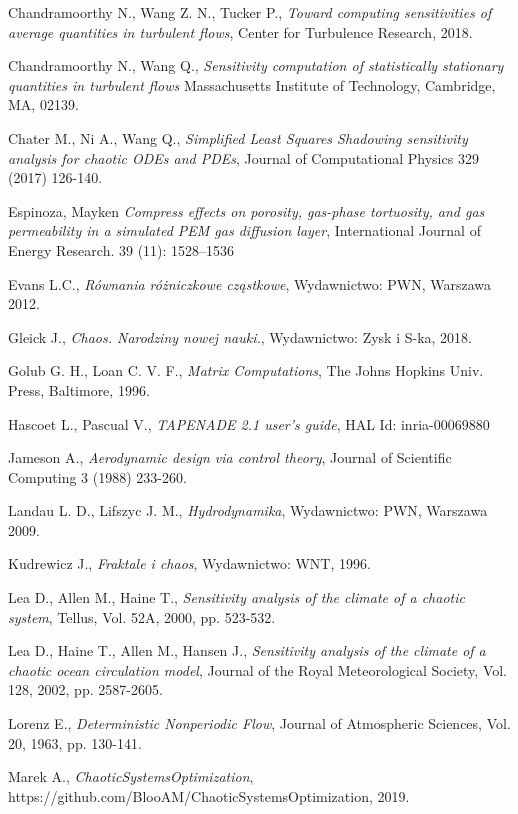 \documentclass[12pt]{article}
\begin{document}
\begin{thebibliography}{99}
 Chandramoorthy N., Wang Z. N., Tucker P.,
\emph{Toward computing sensitivities of average
quantities in turbulent flows},
Center for Turbulence Research, 2018.

 Chandramoorthy N., Wang Q.,
\emph{Sensitivity computation of statistically stationary quantities in turbulent flows}
Massachusetts Institute of Technology, Cambridge, MA, 02139.

 Chater M., Ni A., Wang Q., 
\emph{Simplified Least Squares Shadowing sensitivity analysis for chaotic ODEs and PDEs},
Journal of Computational Physics 329 (2017) 126-140.

 Espinoza, Mayken 
\emph{Compress effects on porosity, gas-phase tortuosity, and gas permeability in a simulated PEM gas diffusion layer},
International Journal of Energy Research. 39 (11): 1528–1536

 Evans L.C.,
\emph{Równania różniczkowe cząstkowe},
Wydawnictwo: PWN, Warszawa 2012.

 Gleick J.,
\emph{Chaos. Narodziny nowej nauki.},
Wydawnictwo: Zysk i S-ka, 2018.

 Golub G. H., Loan C. V. F.,
\emph{Matrix Computations},
The Johns Hopkins Univ. Press, Baltimore, 1996.

 Hascoet L., Pascual V.,
\emph{TAPENADE 2.1 user’s guide},
HAL Id: inria-00069880

 Jameson A.,
\emph{Aerodynamic design via control theory},
Journal of Scientific Computing 3 (1988) 233-260.

 Landau L. D., Lifszyc J. M.,
\emph{Hydrodynamika},
Wydawnictwo: PWN, Warszawa 2009.

 Kudrewicz J., 
\emph{Fraktale i chaos},
Wydawnictwo: WNT, 1996.

 Lea D., Allen M., Haine T.,
\emph{Sensitivity analysis of the climate of a chaotic system},
Tellus, Vol. 52A, 2000, pp. 523-532.

 Lea D., Haine T., Allen M., Hansen J., 
\emph{Sensitivity analysis of the climate of a chaotic ocean circulation model},
Journal of the Royal Meteorological Society, Vol. 128, 2002, pp. 2587-2605.

 Lorenz E.,
\emph{Deterministic Nonperiodic Flow},
Journal of Atmospheric Sciences, Vol. 20, 1963, pp. 130-141.

 Marek A.,
\emph{ChaoticSystemsOptimization},
https://github.com/BlooAM/ChaoticSystemsOptimization, 2019.


\end{thebibliography}
\end{document}
